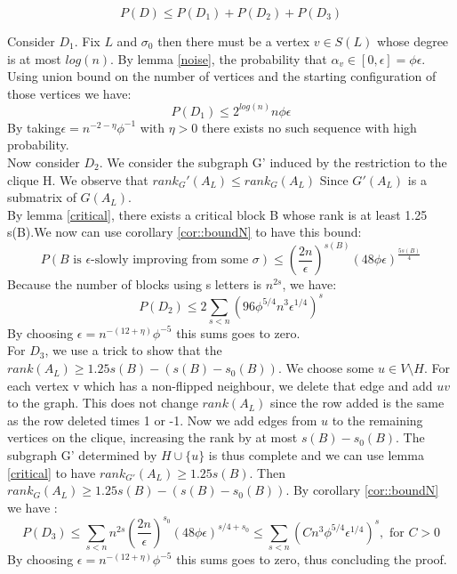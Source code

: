 \begin{equation*}
P(D) \leq P(D_1) + P(D_2) + P(D_3)
\end{equation*}

Consider $D_1$. Fix $L$ and $\sigma_0$ then there must be a vertex $v \in S(L)$ whose degree is at most $log(n)$. By lemma  \ref{noise}, the probability that $\alpha_v \in [0, \epsilon] = \phi \epsilon$. Using union bound on the number of vertices and the starting configuration of those vertices we have:
\begin{equation}
P(D_1)  \leq 2^{log(n)}n \phi \epsilon
\end{equation}
By taking$\epsilon = n^{-2 - \eta} \phi^{-1}$ with $\eta > 0$ there exists no such sequence with high probability. \\

Now consider $D_2$. We consider the subgraph G' induced by the restriction to the clique H. We observe that $rank_G'(A_L) \leq rank_G(A_L)$ Since $G'(A_L)$ is a submatrix of $G(A_L)$.\\ 
By lemma \ref{critical}, there exists a critical block B whose rank is at least 1.25 s(B).We now can use corollary \ref{cor::boundN} to have this bound:
\begin{equation*}
P(B \text{ is }\epsilon \text {-slowly improving from some }\sigma) \leq (\frac{2n}{\epsilon})^{s(B)}(48\phi\epsilon)^{\frac{5s(B)}{4}}
\end{equation*}
Because the number of blocks using s letters is $n^{2s}$, we have:
\begin{equation*}
P(D_2) \leq 2 \sum_{s < n}(96\phi^{5/4}n^3\epsilon^{1/4})^s
\end{equation*}
By choosing $\epsilon = n^{-(12 + \eta)}\phi^{-5}$ this sums goes to zero.\\

For $D_3$, we use a trick to show that the $rank(A_L) \geq 1.25s(B) - (s(B) - s_0(B))$. We choose some $u \in V \setminus H$. For each vertex v which has a non-flipped neighbour, we delete that edge and add $uv$ to the graph. This does not change $rank(A_L)$ since the row added is the same as the row deleted times 1 or -1. Now we add edges from $u$ to the remaining vertices on the clique, increasing the rank by at most $s(B) - s_0(B)$. The subgraph G' determined by $H \cup \{u\}$ is thus complete and we can use  lemma \ref{critical} to have $rank_{G'}(A_L) \geq 1.25 s(B)$. Then $rank_G(A_L) \geq 1.25s(B) - (s(B) - s_0(B))$.
By corollary \ref{cor::boundN} we have :
\begin{equation*}
P(D_3) \leq  \sum_{s < n}n^{2s}(\dfrac{2n}{\epsilon})^{s_0}(48\phi\epsilon)^{s/4 + s_0} \leq \sum_{s < n}(Cn^{3}\phi^{5/4}\epsilon^{1/4})^{s}, \text{ for }C>0
\end{equation*}
By choosing $\epsilon = n^{-(12 + \eta)}\phi^{-5}$ this sums goes to zero, thus concluding the proof.